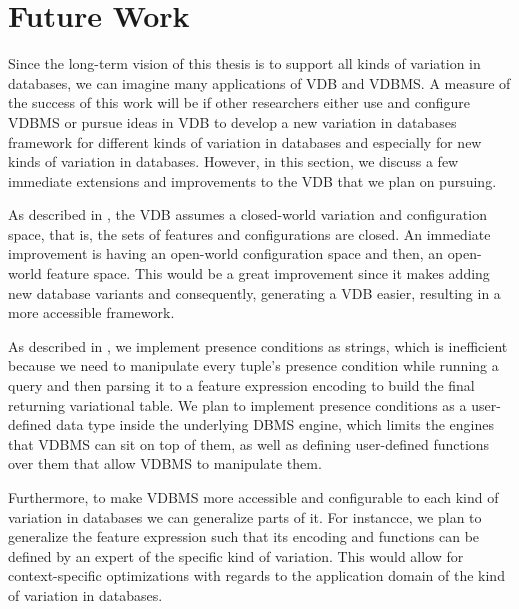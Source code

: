\section{Future Work}
\label{sec:fw}

Since the long-term vision of this thesis is to support all kinds of variation
in databases, we can imagine many applications of VDB and VDBMS. A
measure of the success of this work will be if other researchers either use 
and configure VDBMS or pursue ideas in VDB to develop a new variation 
in databases framework  for different kinds of variation
in databases and especially for new kinds of variation in databases. 
%
However, in this section, we discuss a few immediate extensions and
improvements to the VDB that we plan on pursuing.

As described in , the VDB assumes a 
closed-world variation and configuration space, that is, the sets of features 
and configurations are closed. An immediate improvement is having an
open-world configuration space and then, an open-world feature space.
This would be a great improvement since it makes adding new database
variants and consequently, generating a VDB easier, resulting in a 
more accessible framework.

%
%
As described in , we implement presence conditions as strings, which is
inefficient because we need to manipulate every tuple's 
presence condition while running a 
query and then parsing it to a feature expression encoding to build the final
returning variational table. We plan to implement presence conditions as a 
user-defined data type inside the underlying DBMS engine, which
limits the engines that VDBMS can sit on top of them, as well as
defining user-defined functions over them that allow VDBMS to
manipulate them. 

%
Furthermore, to make VDBMS more accessible and configurable to each 
kind of variation in databases we can generalize parts of it. For instancce, 
we plan to generalize the feature expression such that its encoding and functions
can be defined by an expert of the specific kind of variation. This would allow
for context-specific optimizations with regards to the application domain 
of the kind of variation in databases.


